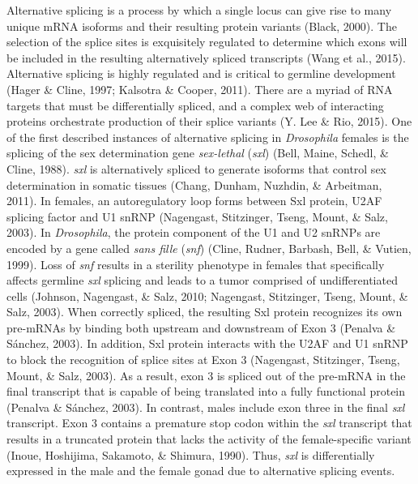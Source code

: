\documentclass[12pt,oneside]{reedthesis}
\begin{document}
Alternative splicing is a process by which a single locus can give rise
to many unique mRNA isoforms and their resulting protein variants
(Black, 2000). The selection of the splice sites is exquisitely
regulated to determine which exons will be included in the resulting
alternatively spliced transcripts (Wang et al., 2015). Alternative splicing
is highly regulated and is critical to germline development
(Hager \& Cline, 1997; Kalsotra \& Cooper, 2011). There are a myriad of RNA targets that
must be differentially spliced, and a complex web of interacting
proteins orchestrate production of their splice variants (Y. Lee \& Rio, 2015).
One of the first described instances of alternative splicing in
\emph{Drosophila} females is the splicing of the sex determination gene
\emph{sex-lethal} (\emph{sxl}) (Bell, Maine, Schedl, \& Cline, 1988). \emph{sxl} is alternatively spliced to
generate isoforms that control sex determination in somatic tissues
(Chang, Dunham, Nuzhdin, \& Arbeitman, 2011). In females, an autoregulatory loop forms between Sxl
protein, U2AF splicing factor and U1 snRNP (Nagengast, Stitzinger, Tseng, Mount, \& Salz, 2003). In
\emph{Drosophila}, the protein component of the U1 and U2 snRNPs are encoded
by a gene called \emph{sans fille} (\emph{snf}) (Cline, Rudner, Barbash, Bell, \& Vutien, 1999). Loss of \emph{snf}
results in a sterility phenotype in females that specifically affects
germline \emph{sxl} splicing and leads to a tumor comprised of
undifferentiated cells (Johnson, Nagengast, \& Salz, 2010; Nagengast, Stitzinger, Tseng, Mount, \& Salz, 2003). When
correctly spliced, the resulting Sxl protein recognizes its own
pre-mRNAs by binding both upstream and downstream of Exon 3
(Penalva \& Sánchez, 2003). In addition, Sxl protein interacts with the U2AF and
U1 snRNP to block the recognition of splice sites at Exon 3
(Nagengast, Stitzinger, Tseng, Mount, \& Salz, 2003). As a result, exon 3 is spliced out of the pre-mRNA
in the final transcript that is capable of being translated into a fully
functional protein (Penalva \& Sánchez, 2003). In contrast, males include exon
three in the final \emph{sxl} transcript. Exon 3 contains a premature stop
codon within the \emph{sxl} transcript that results in a truncated protein
that lacks the activity of the female-specific variant (Inoue, Hoshijima, Sakamoto, \& Shimura, 1990).
Thus, \emph{sxl} is differentially expressed in the male and the female gonad
due to alternative splicing events.
\end{document}
